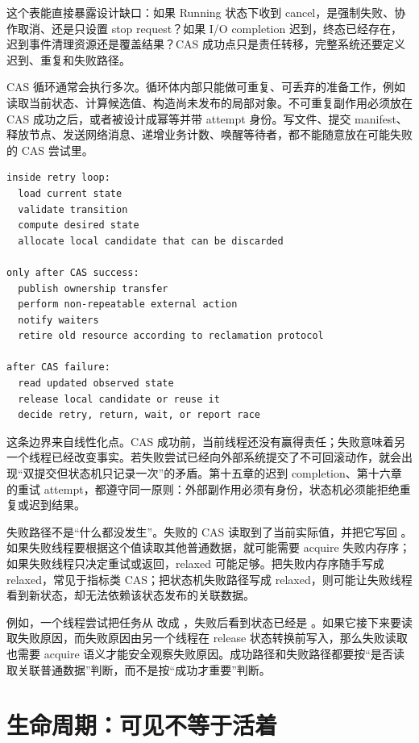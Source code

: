 这个表能直接暴露设计缺口：如果 Running 状态下收到 cancel，是强制失败、协作取消、还是只设置 stop request？如果 I/O completion 迟到，终态已经存在，迟到事件清理资源还是覆盖结果？CAS 成功点只是责任转移，完整系统还要定义迟到、重复和失败路径。

CAS 循环通常会执行多次。循环体内部只能做可重复、可丢弃的准备工作，例如读取当前状态、计算候选值、构造尚未发布的局部对象。不可重复副作用必须放在 CAS 成功之后，或者被设计成幂等并带 attempt 身份。写文件、提交 manifest、释放节点、发送网络消息、递增业务计数、唤醒等待者，都不能随意放在可能失败的 CAS 尝试里。

\begin{lstlisting}[numbers=none,caption={CAS 循环中的动作分层}]
inside retry loop:
  load current state
  validate transition
  compute desired state
  allocate local candidate that can be discarded

only after CAS success:
  publish ownership transfer
  perform non-repeatable external action
  notify waiters
  retire old resource according to reclamation protocol

after CAS failure:
  read updated observed state
  release local candidate or reuse it
  decide retry, return, wait, or report race
\end{lstlisting}

这条边界来自线性化点。CAS 成功前，当前线程还没有赢得责任；失败意味着另一个线程已经改变事实。若失败尝试已经向外部系统提交了不可回滚动作，就会出现“双提交但状态机只记录一次”的矛盾。第十五章的迟到 completion、第十六章的重试 attempt，都遵守同一原则：外部副作用必须有身份，状态机必须能拒绝重复或迟到结果。

失败路径不是“什么都没发生”。失败的 CAS 读取到了当前实际值，并把它写回 。如果失败线程要根据这个值读取其他普通数据，就可能需要 acquire 失败内存序；如果失败线程只决定重试或返回，relaxed 可能足够。把失败内存序随手写成 relaxed，常见于指标类 CAS；把状态机失败路径写成 relaxed，则可能让失败线程看到新状态，却无法依赖该状态发布的关联数据。

例如，一个线程尝试把任务从  改成 ，失败后看到状态已经是 。如果它接下来要读取失败原因，而失败原因由另一个线程在 release 状态转换前写入，那么失败读取也需要 acquire 语义才能安全观察失败原因。成功路径和失败路径都要按“是否读取关联普通数据”判断，而不是按“成功才重要”判断。

\section{生命周期：可见不等于活着}

